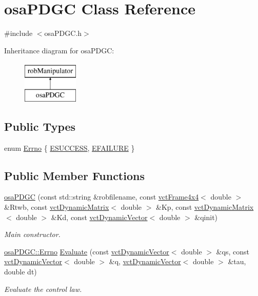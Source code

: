 \hypertarget{classosa_p_d_g_c}{}\section{osa\+P\+D\+G\+C Class Reference}
\label{classosa_p_d_g_c}


{\ttfamily \#include $<$osa\+P\+D\+G\+C.\+h$>$}

Inheritance diagram for osa\+P\+D\+G\+C\+:\begin{figure}[H]
\begin{center}
\leavevmode
\includegraphics[height=2.000000cm]{db/de4/classosa_p_d_g_c}
\end{center}
\end{figure}
\subsection*{Public Types}
\begin{DoxyCompactItemize}
\item 
enum \hyperlink{classosa_p_d_g_c_af906659affdf9f98d957a4942b37f441}{Errno} \{ \hyperlink{classosa_p_d_g_c_af906659affdf9f98d957a4942b37f441a6226106dbd9609d76bc73d8b7fb68c8e}{E\+S\+U\+C\+C\+E\+S\+S}, 
\hyperlink{classosa_p_d_g_c_af906659affdf9f98d957a4942b37f441a03d04c1de6a736fdc57e5de8c4b4da67}{E\+F\+A\+I\+L\+U\+R\+E}
 \}
\end{DoxyCompactItemize}
\subsection*{Public Member Functions}
\begin{DoxyCompactItemize}
\item 
\hyperlink{classosa_p_d_g_c_a8b571b78f40d4c5e8a815f8a6f21a99d}{osa\+P\+D\+G\+C} (const std\+::string \&robfilename, const \hyperlink{classvct_frame4x4}{vct\+Frame4x4}$<$ double $>$ \&Rtwb, const \hyperlink{classvct_dynamic_matrix}{vct\+Dynamic\+Matrix}$<$ double $>$ \&Kp, const \hyperlink{classvct_dynamic_matrix}{vct\+Dynamic\+Matrix}$<$ double $>$ \&Kd, const \hyperlink{classvct_dynamic_vector}{vct\+Dynamic\+Vector}$<$ double $>$ \&qinit)
\begin{DoxyCompactList}\small\item\em Main constructor. \end{DoxyCompactList}\item 
\hyperlink{classosa_p_d_g_c_af906659affdf9f98d957a4942b37f441}{osa\+P\+D\+G\+C\+::\+Errno} \hyperlink{classosa_p_d_g_c_a24a126970a44fbb3123412361c071106}{Evaluate} (const \hyperlink{classvct_dynamic_vector}{vct\+Dynamic\+Vector}$<$ double $>$ \&qs, const \hyperlink{classvct_dynamic_vector}{vct\+Dynamic\+Vector}$<$ double $>$ \&q, \hyperlink{classvct_dynamic_vector}{vct\+Dynamic\+Vector}$<$ double $>$ \&tau, double dt)
\begin{DoxyCompactList}\small\item\em Evaluate the control law. \end{DoxyCompactList}\end{DoxyCompactItemize}
